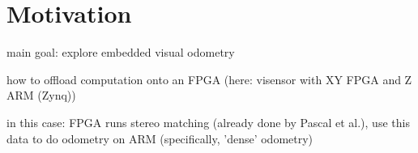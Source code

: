 \chapter{Motivation}
\label{sec:motivation}

main goal: explore embedded visual odometry

how to offload computation onto an FPGA (here: visensor with XY FPGA and Z ARM (Zynq))

in this case: FPGA runs stereo matching (already done by Pascal et al.), use this data to do odometry on ARM (specifically, 'dense' odometry)
